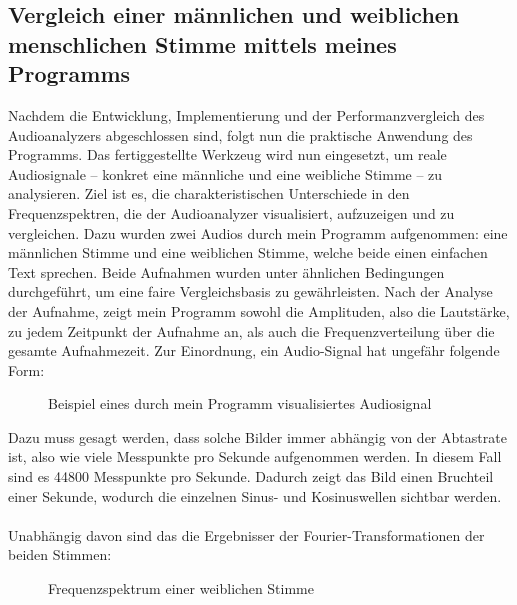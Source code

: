 \documentclass[a4paper,12pt]{article}
\theoremstyle{definition}
\theoremstyle{remark}
\begin{document}
\subsection{Vergleich einer männlichen und weiblichen menschlichen Stimme mittels meines Programms}
Nachdem die Entwicklung, Implementierung und der Performanzvergleich des Audioanalyzers abgeschlossen sind, folgt nun die praktische Anwendung des 
Programms. Das fertiggestellte Werkzeug wird nun eingesetzt, um reale Audiosignale – konkret eine männliche und eine weibliche Stimme – zu analysieren. 
Ziel ist es, die charakteristischen Unterschiede in den Frequenzspektren, die der Audioanalyzer visualisiert, aufzuzeigen und zu vergleichen.
Dazu wurden zwei Audios durch mein Programm aufgenommen: eine männlichen Stimme und eine weiblichen Stimme, welche beide einen einfachen Text sprechen. 
Beide Aufnahmen wurden unter ähnlichen Bedingungen durchgeführt, um eine faire Vergleichsbasis zu gewährleisten. Nach der Analyse der Aufnahme, zeigt 
mein Programm sowohl die Amplituden, also die Lautstärke, zu jedem Zeitpunkt der Aufnahme an, als auch die Frequenzverteilung über die gesamte Aufnahmezeit. 
Zur Einordnung, ein Audio-Signal hat ungefähr folgende Form: 
\begin{figure}[H]
  \centering
  \caption{Beispiel eines durch mein Programm visualisiertes Audiosignal}
\end{figure}
Dazu muss gesagt werden, dass solche Bilder immer abhängig von der Abtastrate ist, also wie viele Messpunkte pro Sekunde aufgenommen werden. In diesem 
Fall sind es 44800 Messpunkte pro Sekunde. Dadurch zeigt das Bild einen Bruchteil einer Sekunde, wodurch die einzelnen Sinus- und Kosinuswellen sichtbar 
werden. 
\\\\
Unabhängig davon sind das die Ergebnisser der Fourier-Transformationen der beiden Stimmen:
\begin{figure}[H]
  \centering
  \caption{Frequenzspektrum einer weiblichen Stimme}
\end{figure}
\end{document}
